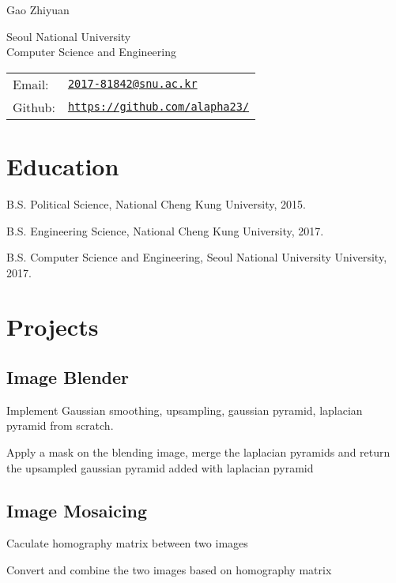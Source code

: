 \documentclass[letterpaper]{article}
\def\name{Gao Zhiyuan}
\renewenvironment{itemize}{
  \begin{list}{}{
    \setlength{\leftmargin}{1.5em}
  }
}{
  \end{list}
}
\begin{document}
{\huge \name}


\vspace{0.25in}
\begin{minipage}{0.45\linewidth}
  Seoul National University \\
  Computer Science and Engineering \\
\end{minipage}
\begin{minipage}{0.45\linewidth}
  \begin{tabular}{ll}
    Email: & \href{mailto:2017-81842@snu.ac.kr}{\tt 2017-81842@snu.ac.kr} \\
    Github: & \href{https://github.com/alapha23/}{\tt https://github.com/alapha23/} \\
  \end{tabular}
\end{minipage}
\section*{Education}
\begin{itemize}
  \item B.S. Political Science, National Cheng Kung University, 2015.
  \item B.S. Engineering Science, National Cheng Kung University, 2017.
  \item B.S. Computer Science and Engineering, Seoul National University University, 2017.
\end{itemize}
\section*{Projects}
\subsection*{\textbf{Image Blender}}
\begin{itemize}
	\item Implement Gaussian smoothing, upsampling, gaussian pyramid, laplacian pyramid from scratch.
	\item Apply a mask on the blending image, merge the laplacian pyramids and return the upsampled gaussian pyramid added with laplacian pyramid
\end{itemize}

\subsection*{\textbf{Image Mosaicing}}
\begin{itemize}
	\item Caculate homography matrix between two images
	\item Convert and combine the two images based on homography matrix
\end{itemize}
\end{document}
